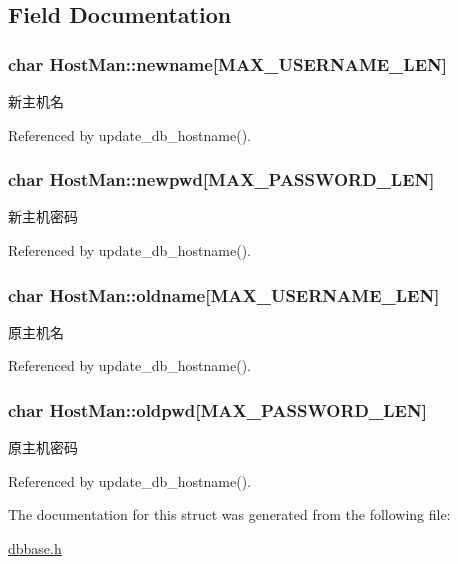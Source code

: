 \subsection{Field Documentation}
\hypertarget{structHostMan_a51767ec848f109bccbddb87550ff88d9}{
\subsubsection[{newname}]{\setlength{\rightskip}{0pt plus 5cm}char Host\-Man\-::newname\mbox{[}{\bf M\-A\-X\-\_\-\-U\-S\-E\-R\-N\-A\-M\-E\-\_\-\-L\-E\-N}\mbox{]}}}\label{structHostMan_a51767ec848f109bccbddb87550ff88d9}


新主机名 



Referenced by update\-\_\-db\-\_\-hostname().

\hypertarget{structHostMan_a6f5cb28d8740dae24ee076d6cd2fb63e}{
\subsubsection[{newpwd}]{\setlength{\rightskip}{0pt plus 5cm}char Host\-Man\-::newpwd\mbox{[}{\bf M\-A\-X\-\_\-\-P\-A\-S\-S\-W\-O\-R\-D\-\_\-\-L\-E\-N}\mbox{]}}}\label{structHostMan_a6f5cb28d8740dae24ee076d6cd2fb63e}


新主机密码 



Referenced by update\-\_\-db\-\_\-hostname().

\hypertarget{structHostMan_a1441529ae42ac0b02704431e41f5b5c3}{
\subsubsection[{oldname}]{\setlength{\rightskip}{0pt plus 5cm}char Host\-Man\-::oldname\mbox{[}{\bf M\-A\-X\-\_\-\-U\-S\-E\-R\-N\-A\-M\-E\-\_\-\-L\-E\-N}\mbox{]}}}\label{structHostMan_a1441529ae42ac0b02704431e41f5b5c3}


原主机名 



Referenced by update\-\_\-db\-\_\-hostname().

\hypertarget{structHostMan_a94f32dd3715b3069fa469ca3ea5ea1e7}{
\subsubsection[{oldpwd}]{\setlength{\rightskip}{0pt plus 5cm}char Host\-Man\-::oldpwd\mbox{[}{\bf M\-A\-X\-\_\-\-P\-A\-S\-S\-W\-O\-R\-D\-\_\-\-L\-E\-N}\mbox{]}}}\label{structHostMan_a94f32dd3715b3069fa469ca3ea5ea1e7}


原主机密码 



Referenced by update\-\_\-db\-\_\-hostname().



The documentation for this struct was generated from the following file\-:\begin{DoxyCompactItemize}
\item 
\hyperlink{dbbase_8h}{dbbase.\-h}\end{DoxyCompactItemize}
